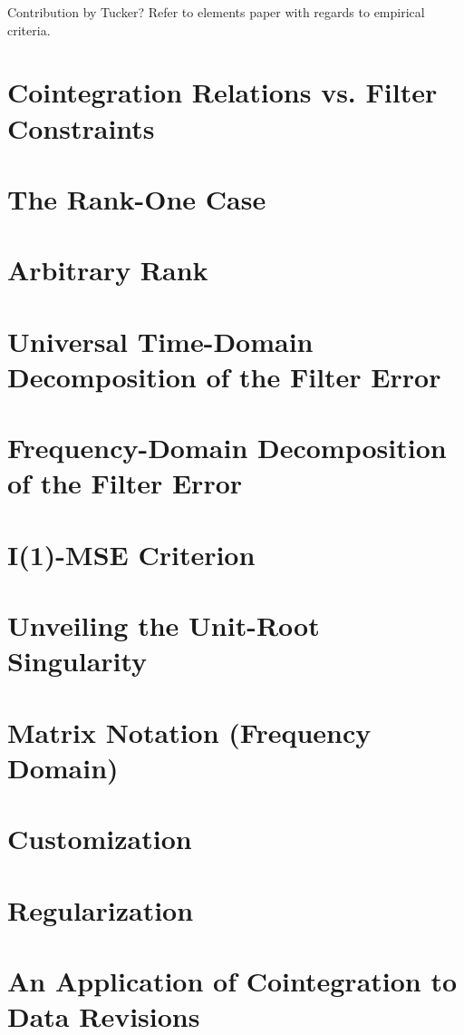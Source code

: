 \documentclass[a4paper]{book}
\begin{document}
Contribution by Tucker? Refer to elements paper with regards to empirical criteria.

\section{Cointegration Relations vs. Filter Constraints}

\section{The Rank-One Case}

\section{Arbitrary Rank}

\section{Universal Time-Domain Decomposition of the Filter Error}

\section{Frequency-Domain Decomposition of the Filter Error}

\section{I(1)-MSE Criterion}

\section{Unveiling the Unit-Root Singularity}

\section{Matrix Notation (Frequency Domain)}

\section{Customization}

\section{Regularization}

\section{An Application of Cointegration to Data Revisions}
\end{document}
